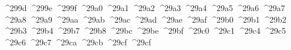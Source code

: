 {  ^^^^299d%
  ^^^^299e%
  ^^^^299f%
  ^^^^29a0%
  ^^^^29a1%
  ^^^^29a2%
  ^^^^29a3%
  ^^^^29a4%
  ^^^^29a5%
  ^^^^29a6%
  ^^^^29a7%
  ^^^^29a8%
  ^^^^29a9%
  ^^^^29aa%
  ^^^^29ab%
  ^^^^29ac%
  ^^^^29ad%
  ^^^^29ae%
  ^^^^29af%
  ^^^^29b0%
  ^^^^29b1%
  ^^^^29b2%
  ^^^^29b3%
  ^^^^29b4%
  ^^^^29b7%
  ^^^^29b8%
  ^^^^29bc%
  ^^^^29be%
  ^^^^29bf%
  ^^^^29c0%
  ^^^^29c1%
  ^^^^29c4%
  ^^^^29c5%
  ^^^^29c6%
  ^^^^29c7%
  ^^^^29ca%
  ^^^^29cb%
  ^^^^29cf%
  ^^^^29cf%
}
